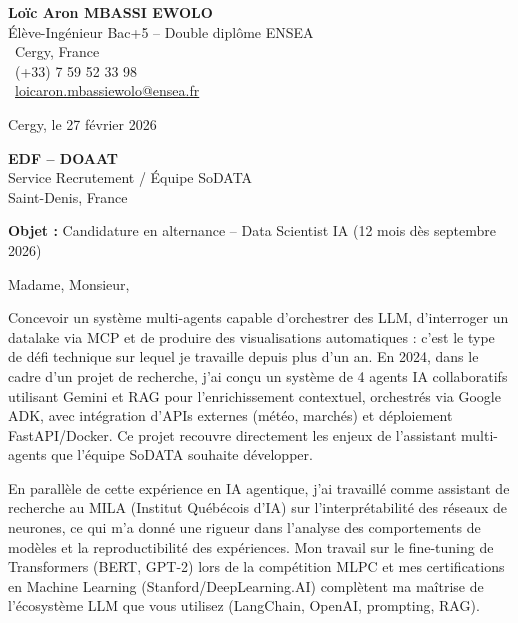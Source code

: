 \documentclass[a4paper,11pt]{article}
\begin{document}
\noindent
\begin{minipage}[t]{0.5\textwidth}
    \textbf{Loïc Aron MBASSI EWOLO}\\
    Élève-Ingénieur Bac+5 -- Double diplôme ENSEA\\[3pt]
    \faMapMarker\ Cergy, France\\
    \faPhone\ (+33) 7 59 52 33 98\\
    \faEnvelope\ \href{mailto:loicaron.mbassiewolo@ensea.fr}{loicaron.mbassiewolo@ensea.fr}
\end{minipage}
\hfill
\begin{minipage}[t]{0.4\textwidth}
    \raggedleft
    Cergy, le 27 février 2026
\end{minipage}

\vspace{1.2cm}

\hfill
\begin{minipage}[t]{0.5\textwidth}
    \raggedleft
    \textbf{EDF -- DOAAT}\\
    Service Recrutement / Équipe SoDATA\\
    Saint-Denis, France
\end{minipage}

\vspace{1cm}

\noindent\textbf{Objet :} Candidature en alternance -- Data Scientist IA (12 mois dès septembre 2026)

\vspace{0.8cm}

Madame, Monsieur,

Concevoir un système multi-agents capable d'orchestrer des LLM, d'interroger un datalake via MCP et de produire des visualisations automatiques : c'est le type de défi technique sur lequel je travaille depuis plus d'un an. En 2024, dans le cadre d'un projet de recherche, j'ai conçu un système de 4 agents IA collaboratifs utilisant Gemini et RAG pour l'enrichissement contextuel, orchestrés via Google ADK, avec intégration d'APIs externes (météo, marchés) et déploiement FastAPI/Docker. Ce projet recouvre directement les enjeux de l'assistant multi-agents que l'équipe SoDATA souhaite développer.

En parallèle de cette expérience en IA agentique, j'ai travaillé comme assistant de recherche au MILA (Institut Québécois d'IA) sur l'interprétabilité des réseaux de neurones, ce qui m'a donné une rigueur dans l'analyse des comportements de modèles et la reproductibilité des expériences. Mon travail sur le fine-tuning de Transformers (BERT, GPT-2) lors de la compétition MLPC et mes certifications en Machine Learning (Stanford/DeepLearning.AI) complètent ma maîtrise de l'écosystème LLM que vous utilisez (LangChain, OpenAI, prompting, RAG).
\end{document}
